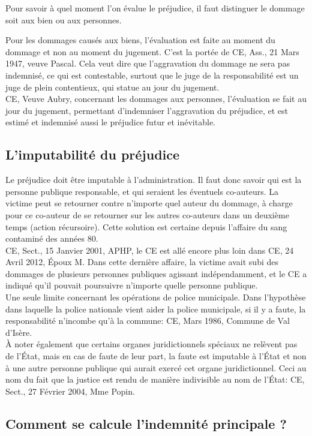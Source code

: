 \documentclass[10pt, a4paper, openany]{book}
\begin{document}
Pour savoir à quel moment l'on évalue le préjudice, il faut distinguer le dommage soit aux bien ou aux personnes. 


Pour les dommages causés aux biens, l'évaluation est faite au moment du dommage et non au moment du jugement. C'est la portée de CE, Ass., 21 Mars 1947, veuve Pascal. Cela veut dire que l'aggravation du dommage ne sera pas indemnisé, ce qui est contestable, surtout que le juge de la responsabilité est un juge de plein contentieux, qui statue au jour du jugement. \\
CE, Veuve Aubry, concernant les dommages aux personnes, l'évaluation se fait au jour du jugement, permettant d'indemniser l'aggravation du préjudice, et est estimé et indemnisé aussi le préjudice futur et inévitable.

\subsection{L'imputabilité du préjudice}

Le préjudice doit être imputable à l'administration. Il faut donc savoir qui est la personne publique responsable, et qui seraient les éventuels co-auteurs. La victime peut se retourner contre n'importe quel auteur du dommage, à charge pour ce co-auteur de se retourner sur les autres co-auteurs dans un deuxième temps (action récursoire). Cette solution est certaine depuis l'affaire du sang contaminé des années 80. \\
CE, Sect., 15 Janvier 2001, APHP, le CE est allé encore plus loin dans CE, 24 Avril 2012, Époux M. Dans cette dernière affaire, la victime avait subi des dommages de plusieurs personnes publiques agissant indépendamment, et le CE a indiqué qu'il pouvait poursuivre n'importe quelle personne publique. \\
Une seule limite concernant les opérations de police municipale. Dans l'hypothèse dans laquelle la police nationale vient aider la police municipale, si il y a faute, la responsabilité n'incombe qu'à la commune: CE, Mars 1986, Commune de Val d'Isère. \\
À noter également que certains organes juridictionnels spéciaux ne relèvent pas de l'État, mais en cas de faute de leur part, la faute est imputable à l'État et non à une autre personne publique qui aurait exercé cet organe juridictionnel. Ceci au nom du fait que la justice est rendu de manière indivisible au nom de l'État: CE, Sect., 27 Février 2004, Mme Popin. 

\subsection{Comment se calcule l'indemnité principale ?}
\end{document}
